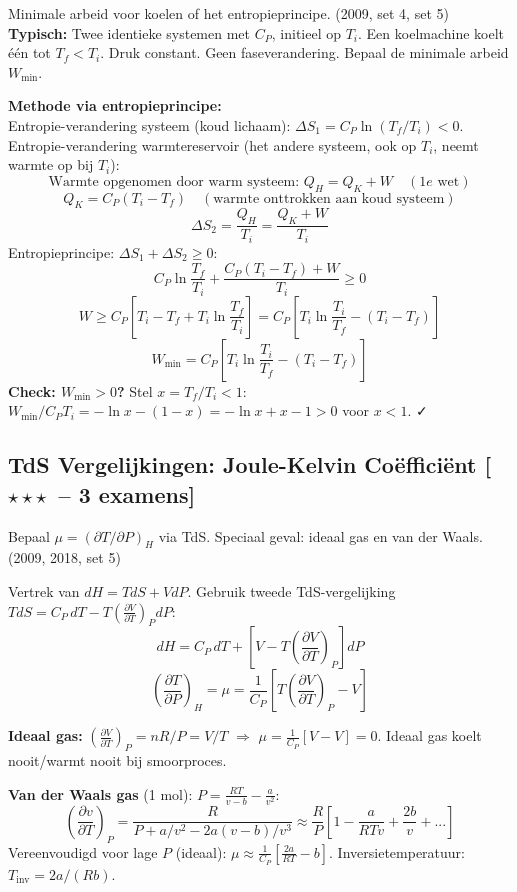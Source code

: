 \documentclass[10pt,a4paper]{article}
\newcommand{\pder}[2]{\left(\frac{\partial #1}{\partial #2}\right)}
\begin{document}
\begin{oefening}{Minimale arbeid voor koelen of het entropieprincipe. \textnormal{(2009, set 4, set 5)}}
\textbf{Typisch:} Twee identieke systemen met $C_P$, initieel op $T_i$. Een koelmachine koelt één tot $T_f < T_i$. Druk constant. Geen faseverandering. Bepaal de minimale arbeid $W_\text{min}$.
\end{oefening}

\begin{oplossing}
\textbf{Methode via entropieprincipe:}\\
Entropie-verandering systeem (koud lichaam): $\Delta S_1 = C_P\ln(T_f/T_i) < 0$.\\
Entropie-verandering warmtereservoir (het andere systeem, ook op $T_i$, neemt warmte op bij $T_i$):
$$\text{Warmte opgenomen door warm systeem: } Q_H = Q_K + W \quad (1e \text{ wet})$$
$$Q_K = C_P(T_i - T_f) \quad (\text{warmte onttrokken aan koud systeem})$$
$$\Delta S_2 = \frac{Q_H}{T_i} = \frac{Q_K + W}{T_i}$$
Entropieprincipe: $\Delta S_1 + \Delta S_2 \geq 0$:
$$C_P\ln\frac{T_f}{T_i} + \frac{C_P(T_i-T_f) + W}{T_i} \geq 0$$
$$W \geq C_P\left[T_i - T_f + T_i\ln\frac{T_f}{T_i}\right] = C_P\left[T_i\ln\frac{T_i}{T_f} - (T_i-T_f)\right]$$
$$\boxed{W_\text{min} = C_P\left[T_i\ln\frac{T_i}{T_f} - (T_i - T_f)\right]}$$
\textbf{Check: $W_\text{min} > 0$?} Stel $x = T_f/T_i < 1$: $W_\text{min}/C_PT_i = -\ln x - (1-x) = -\ln x + x - 1 > 0$ voor $x<1$. ✓
\end{oplossing}

\subsection{TdS Vergelijkingen: Joule-Kelvin Coëfficiënt \textnormal{\color{warningred}[$\star\star\star$\ -- 3 examens]}}

\begin{oefening}{Bepaal $\mu = (\partial T/\partial P)_H$ via TdS. Speciaal geval: ideaal gas en van der Waals. \textnormal{(2009, 2018, set 5)}}
\end{oefening}

\begin{oplossing}
Vertrek van $dH = TdS + VdP$. Gebruik tweede TdS-vergelijking $TdS = C_P\,dT - T\pder{V}{T}_P dP$:
$$dH = C_P\,dT + \left[V - T\pder{V}{T}_P\right]dP$$
$$\pder{T}{P}_H = \mu = \frac{1}{C_P}\left[T\pder{V}{T}_P - V\right]$$

\textbf{Ideaal gas:} $\pder{V}{T}_P = nR/P = V/T$ $\Rightarrow$ $\mu = \frac{1}{C_P}\left[V - V\right] = 0$. Ideaal gas koelt nooit/warmt nooit bij smoorproces.

\textbf{Van der Waals gas} (1 mol): $P = \frac{RT}{v-b} - \frac{a}{v^2}$:
$$\pder{v}{T}_P = \frac{R}{P + a/v^2 - 2a(v-b)/v^3} \approx \frac{R}{P}\left[1 - \frac{a}{RTv} + \frac{2b}{v} + ...\right]$$
Vereenvoudigd voor lage $P$ (ideaal): $\mu \approx \frac{1}{C_P}\left[\frac{2a}{RT} - b\right]$.
Inversietemperatuur: $T_\text{inv} = 2a/(Rb)$.
\end{oplossing}
\end{document}
